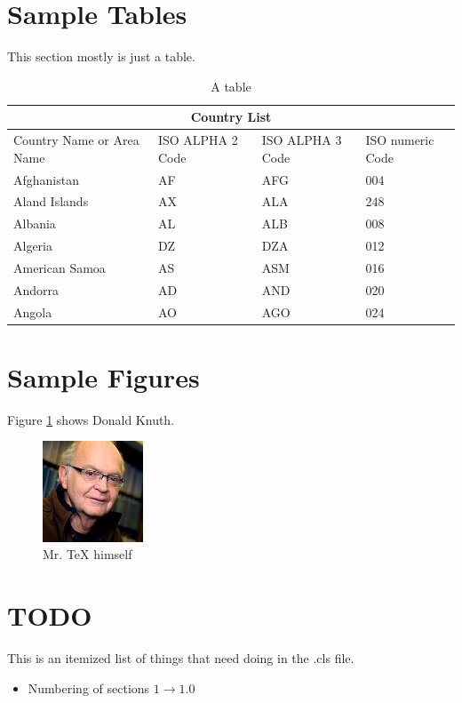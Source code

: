 \documentclass[ece]{uw-wkrpt}
\begin{document}
\section{Sample Tables}
This section mostly is just a table.
    \begin{table}[h]
        \centering
        \caption{A table}
        \label{tab:test}
        \begin{tabular}{ |p{3cm}||p{3cm}|p{3cm}|p{3cm}|  }
         \hline
         \multicolumn{4}{|c|}{Country List} \\
         \hline
         Country Name     or Area Name& ISO ALPHA 2 Code &ISO ALPHA 3 Code&ISO numeric Code\\
         \hline
         Afghanistan   & AF    &AFG&   004\\
         Aland Islands&   AX  & ALA   &248\\
         Albania &AL & ALB&  008\\
         Algeria    &DZ & DZA&  012\\
         American Samoa&   AS  & ASM&016\\
         Andorra& AD  & AND   &020\\
         Angola& AO  & AGO&024\\
         \hline
        \end{tabular}
    \end{table}

\section{Sample Figures}
Figure \ref{fig:knuth} shows Donald Knuth. \cite{ref:donpicture}
\begin{figure}
    \centering
    \includegraphics[height=3cm]{test.jpg}
    \caption{Mr. \TeX{} himself \cite{ref:latex2e}}
    \label{fig:knuth}
\end{figure}

\section{TODO}
This is an itemized list of things that need doing in the .cls file.
\begin{itemize}
    \item Numbering of sections $1 \rightarrow 1.0$
\end{itemize}
\end{document}
